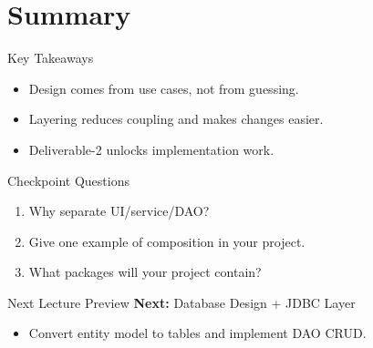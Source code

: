 \documentclass{beamer}
\begin{document}
\section{Summary}
\label{sec:summary}

\begin{frame}{Key Takeaways}
  \begin{itemize}[<+->]
    \item Design comes from use cases, not from guessing.
    \item Layering reduces coupling and makes changes easier.
    \item Deliverable-2 unlocks implementation work.
  \end{itemize}
  \slidesources{\OOPSUnitVISources}
\end{frame}

\begin{frame}{Checkpoint Questions}
  \begin{enumerate}[<+->]
    \item Why separate UI/service/DAO?
    \item Give one example of composition in your project.
    \item What packages will your project contain?
  \end{enumerate}
  \slidesources{\OOPSUnitVISources}
\end{frame}

\begin{frame}{Next Lecture Preview}
  \textbf{Next:} Database Design + JDBC Layer
  \vspace{0.6em}
  \begin{itemize}[<+->]
    \item Convert entity model to tables and implement DAO CRUD.
  \end{itemize}
  \slidesources{\OOPSUnitVISources}
\end{frame}
\end{document}
